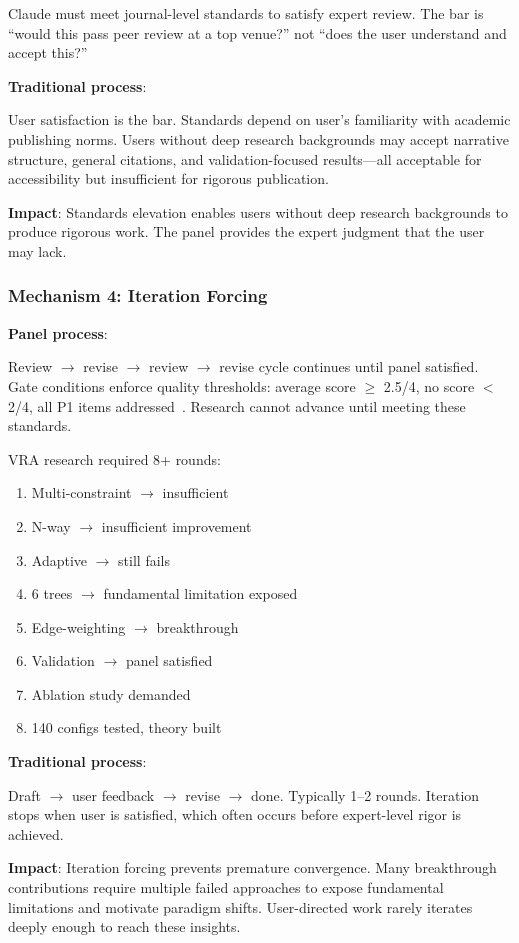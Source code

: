 Claude must meet journal-level standards to satisfy expert review. The bar is ``would this pass peer review at a top venue?'' not ``does the user understand and accept this?''

\textbf{Traditional process}:

User satisfaction is the bar. Standards depend on user's familiarity with academic publishing norms. Users without deep research backgrounds may accept narrative structure, general citations, and validation-focused results---all acceptable for accessibility but insufficient for rigorous publication.

\textbf{Impact}: Standards elevation enables users without deep research backgrounds to produce rigorous work. The panel provides the expert judgment that the user may lack.

\subsubsection{Mechanism 4: Iteration Forcing}

\textbf{Panel process}:

Review $\to$ revise $\to$ review $\to$ revise cycle continues until panel satisfied. Gate conditions enforce quality thresholds: average score $\geq$ 2.5/4, no score $<$ 2/4, all P1 items addressed~\cite{dellalibera2026review}. Research cannot advance until meeting these standards.

VRA research required 8+ rounds:
\begin{enumerate}
\item Multi-constraint $\to$ insufficient
\item N-way $\to$ insufficient improvement
\item Adaptive $\to$ still fails
\item 6 trees $\to$ fundamental limitation exposed
\item Edge-weighting $\to$ breakthrough
\item Validation $\to$ panel satisfied
\item Ablation study demanded
\item 140 configs tested, theory built
\end{enumerate}

\textbf{Traditional process}:

Draft $\to$ user feedback $\to$ revise $\to$ done. Typically 1--2 rounds. Iteration stops when user is satisfied, which often occurs before expert-level rigor is achieved.

\textbf{Impact}: Iteration forcing prevents premature convergence. Many breakthrough contributions require multiple failed approaches to expose fundamental limitations and motivate paradigm shifts. User-directed work rarely iterates deeply enough to reach these insights.

